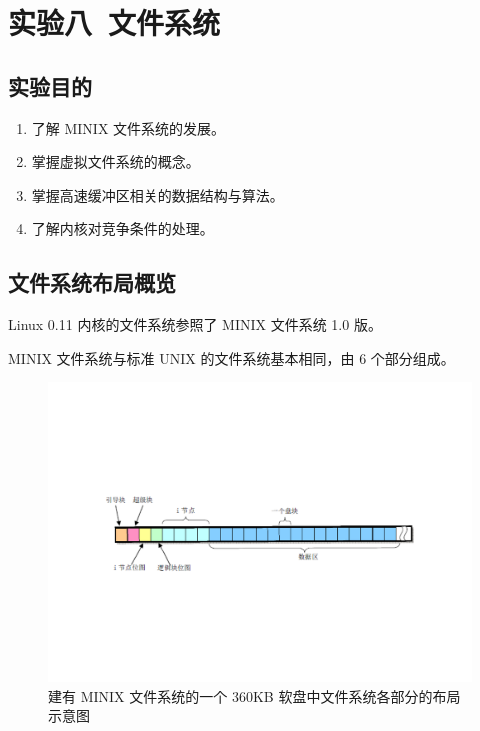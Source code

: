 \section{实验八\ 文件系统}

\subsection{实验目的}

\begin{enumerate}
    \item 了解 MINIX 文件系统的发展。
    \item 掌握虚拟文件系统的概念。
    \item 掌握高速缓冲区相关的数据结构与算法。
    \item 了解内核对竞争条件的处理。
\end{enumerate}

\subsection{文件系统布局概览}

Linux 0.11 内核的文件系统参照了 MINIX 文件系统 1.0 版。

MINIX 文件系统与标准 UNIX 的文件系统基本相同，由 6 个部分组成。

\begin{figure}[htbp]
    \centering
    \includegraphics[width=\textwidth]{img/建有MINIX文件系统的一个360KB软盘中文件系统各部分的布局示意图.pdf}
    \caption{建有 MINIX 文件系统的一个 360KB 软盘中文件系统各部分的布局示意图}
    \label{fig:建有MINIX文件系统的一个360KB软盘中文件系统各部分的布局示意图}
\end{figure}


